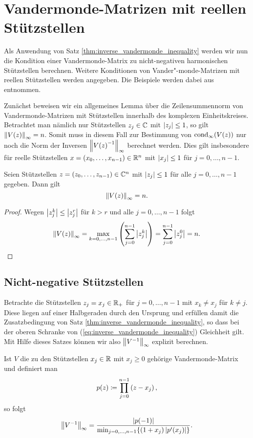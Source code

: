
\chapter{Vandermonde-Matrizen mit reellen Stützstellen}
Als Anwendung von Satz \ref{thm:inverse_vandermonde_inequality} werden wir nun
die Kondition einer Vandermonde-Matrix zu nicht-negativen harmonischen Stützstellen
berechnen.
Weitere Konditionen von Vander"-monde-Matrizen mit reellen Stützstellen werden
angegeben.
Die Beispiele werden dabei aus \cite[S. 197-199]{gautschi1} entnommen.

Zunächst beweisen wir ein allgemeines Lemma über die Zeilensummennorm
von Vandermonde-Matrizen mit Stützstellen innerhalb des komplexen
Einheitskreises.
Betrachtet man nämlich nur Stützstellen $z_j \in \C$ mit $\abs{z_j} \leq 1$,
so gilt $\norm{\Vand{z}}_{\infty} = n$.
Somit muss in diesem Fall zur Bestimmung von $\cond[\infty]{\Vand{z}}$ nur noch die
Norm der Inversen $\norm{\Vand{z}^{-1}}_{\infty}$ berechnet werden.
Dies gilt insbesondere für reelle Stützstellen
$x = (x_0, \dots, x_{n-1}) \in \Rn$ mit $\abs{x_j} \leq 1$ für $j=0, \dots, n-1$.

\begin{lemma}
    \label{lemma:infty_norm_vandermonde_unit_roots}
    Seien Stützstellen $z = (z_0, \dots, z_{n-1}) \in \Cn$
    mit $\abs{z_j} \leq 1$ für alle\linebreak
    $j=0,\dots,n-1$ gegeben.
    Dann gilt
    \begin{equation}
        \label{eq:infty_norm_vandermonde_unit_roots}
        \norm{V(z)}_{\infty} = n.
    \end{equation}
\end{lemma}

\begin{proof}
    Wegen $\abs{z_j^k} \leq \abs{z_j^r}$ für $k > r$ und alle $j = 0, \dots, n-1$ folgt
    \[
        \norm{V(z)}_{\infty}
        = \max_{k=0,\dots,n-1} \left( \sum_{j=0}^{n-1} \abs{z_j^k} \right)
        = \sum_{j=0}^{n-1} \abs{z_j^0}
        = n.
    \]
\end{proof}

\section{Nicht-negative Stützstellen}
Betrachte die Stützstellen $z_j = x_j \in \R_+$ für $j = 0, \dots, n-1$
mit $x_k \neq x_j$ für $k \neq j$.
Diese liegen auf einer Halbgeraden durch den Ursprung und erfüllen damit die
Zusatzbedingung von Satz \ref{thm:inverse_vandermonde_inequality},
so dass bei der oberen Schranke von (\ref{eq:inverse_vandermonde_inequality})
Gleichheit gilt.
Mit Hilfe dieses Satzes können wir also $\norm{V^{-1}}_\infty$ explizit berechnen.
\begin{lemma}
    \label{lemma:nonnegative_real_nodes}
    Ist $V$ die zu den Stützstellen $x_j \in \R$ mit $x_j \geq 0$ gehörige
    Vandermonde-Matrix und definiert man
    \[
        p(z) \defeq \prod_{j=0}^{n-1} \left( z - x_j \right),
    \]
    so folgt
    \[
        \norm{V^{-1}}_{\infty} = \frac{ \abs{p(-1)}}{\min_{j=0, \dots, n-1} \{ (1+x_j) \abs{p^{\prime}(x_j)} \}}.
    \]
\end{lemma}

